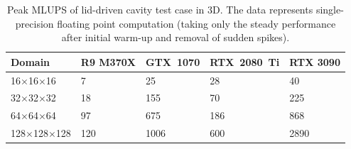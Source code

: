 \begin{table}[!ht]
	\centering\small
	{\renewcommand{\arraystretch}{1.1}%
		{\setlength{\tabcolsep}{0.5em}
			\begin{tabular}{ |p{3.2cm}||p{2.2cm}|p{2.2cm}|p{2.4cm}|p{2.2cm}|  }
				\hline
				Domain & R9 M370X & GTX~1070 & RTX~2080~Ti & RTX 3090 \\
				\hline
				16$\times$16$\times$16   & 7 & 25  & 28  & 40  \\
				\hline
				32$\times$32$\times$32   & 18 & 155  & 70   & 225  \\
				\hline
				64$\times$64$\times$64   & 97 & 675  & 186   & 868  \\
				\hline
				128$\times$128$\times$128   & 120 & 1006  & 600   & 2890  \\
				\hline
	\end{tabular}}}
	\caption{Peak MLUPS of lid-driven cavity test case in 3D. The data represents single-precision floating point computation (taking only the steady performance after initial warm-up and removal of sudden spikes).}
	\label{tab:lid-mlups-all-3d}
\end{table}

